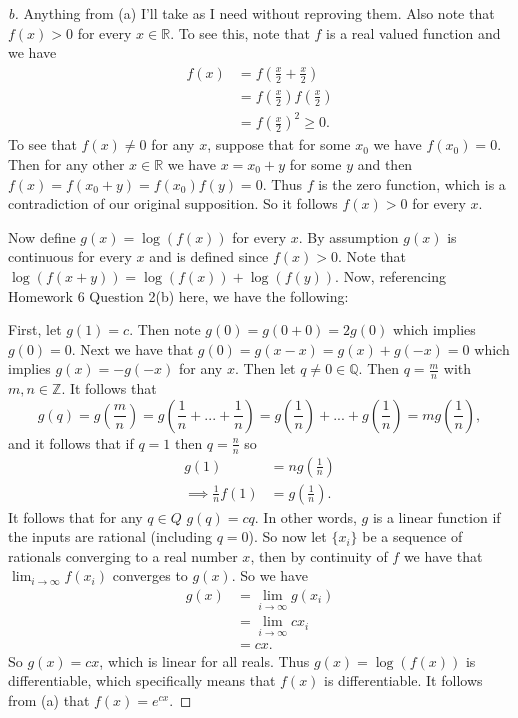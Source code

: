 \documentclass[leqno]{article}
\theoremstyle{nonumberplain}
\newtheorem{proof}{Proof}
\newcommand{\R}{\mathbb{R}}
\begin{document}
\begin{proof}[b]
Anything from (a) I'll take as I need without reproving them.  Also note that $f(x)>0$ for every $x\in \mathbb{R}$.  To see this, note that $f$ is a real valued function and we have 
\begin{align*}
f(x)&=f\left( \frac{x}{2} +\frac{x}{2}\right)\\
&= f\left( \frac{x}{2}\right) f\left( \frac{x}{2}\right)\\
&=f\left( \frac{x}{2}\right)^2 \geq 0.
\end{align*}
To see that $f(x)\neq 0$ for any $x$, suppose that for some $x_0$ we have $f(x_0)=0$. Then for any other $x\in \R$ we have $x=x_0+y$ for some $y$ and then $f(x)=f(x_0+y)=f(x_0)f(y)=0$.  Thus $f$ is the zero function, which is a contradiction of our original supposition. So it follows $f(x)>0$ for every $x$.

Now define $g(x)=\log(f(x))$ for every $x$.  By assumption $g(x)$ is continuous for every $x$ and is defined since $f(x)>0$.  Note that $\log(f(x+y))=\log(f(x))+\log(f(y))$.  Now, referencing Homework 6 Question 2(b) here, we have the following:

First, let $g(1)=c$. Then note $g(0)=g(0+0)=2g(0)$ which implies $g(0)=0$. Next we have that $g(0)=g(x-x)=g(x)+g(-x)=0$ which implies $g(x)=-g(-x)$ for any $x$.  Then let $q\neq 0 \in \mathbb{Q}$. Then $q=\frac{m}{n}$ with $m,n\in \mathbb{Z}$. It follows that
\[g(q)=g\left(\frac{m}{n}\right)=g\left(\frac{1}{n}+...+\frac{1}{n}\right)=g\left(\frac{1}{n}\right)+...+g\left(\frac{1}{n}\right)=mg\left(\frac{1}{n}\right),
\]
and it follows that if $q=1$ then $q=\frac{n}{n}$ so
\begin{align*}
g(1)&=ng\left(\frac{1}{n}\right)\\
\implies \frac{1}{n}f(1)&=g\left(\frac{1}{n}\right).
\end{align*}
It follows that for any $q\in Q$ $g(q)=cq$. In other words, $g$ is a linear function if the inputs are rational (including $q=0$).  So now let $\{x_i\}$ be a sequence of rationals converging to a real number $x$, then by continuity of $f$ we have that $\lim_{i\to \infty} f(x_i)$ converges to $g(x)$. So we have
\begin{align*}
g(x)&=\lim_{i\to \infty} g(x_i)\\
&= \lim_{i\to \infty} c x_i\\
&=cx.
\end{align*}
So $g(x)=cx$, which is linear for all reals.  Thus $g(x)=\log(f(x))$ is differentiable, which specifically means that $f(x)$ is differentiable.  It follows from (a) that $f(x)=e^{cx}$.


\end{proof}
\end{document}
